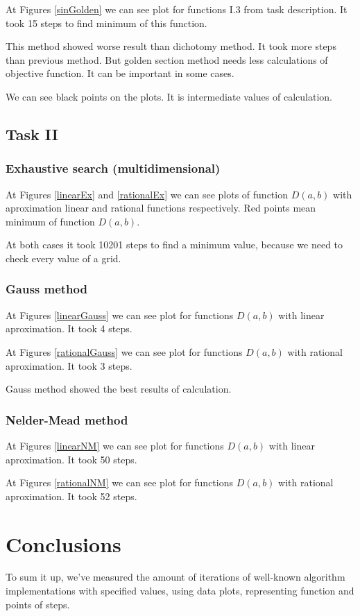\documentclass[a4paper,article,14pt]{extarticle}
\begin{document}
	At Figures \ref{sinGolden} we can see plot for functions I.3 from task description. It took 15 steps to find minimum of this function.
	
	This method showed worse result than dichotomy method. It took more steps than previous method. But golden section method needs less calculations of objective function. It can be important in some cases.
	
	We can see black points on the plots. It is intermediate values of calculation. 
	
	\subsection{Task II}
	\subsubsection{Exhaustive search (multidimensional)}
	
	At Figures \ref{linearEx} and \ref{rationalEx} we can see plots of function $D(a,b)$ with aproximation linear and rational functions respectively. Red points mean minimum of function $D(a,b)$.
	
	At both cases it took 10201 steps to find a minimum value, because we need to check every value of a grid.
	
	\subsubsection{Gauss method}
	
	At Figures \ref{linearGauss} we can see plot for functions $D(a,b)$ with linear aproximation. It took 4 steps.
	
	At Figures \ref{rationalGauss} we can see plot for functions $D(a,b)$ with rational aproximation. It took 3 steps.
	
	Gauss method showed the best results of calculation.
	
	\subsubsection{Nelder-Mead method}
	
	At Figures \ref{linearNM} we can see plot for functions $D(a,b)$ with linear aproximation. It took 50 steps.
	
	At Figures \ref{rationalNM} we can see plot for functions $D(a,b)$ with rational aproximation. It took 52 steps.
	
	\section{Conclusions}
	To sum it up, we’ve measured the amount of iterations of well-known algorithm implementations with specified values, using data plots, representing function and points of steps.
	
\end{document}
